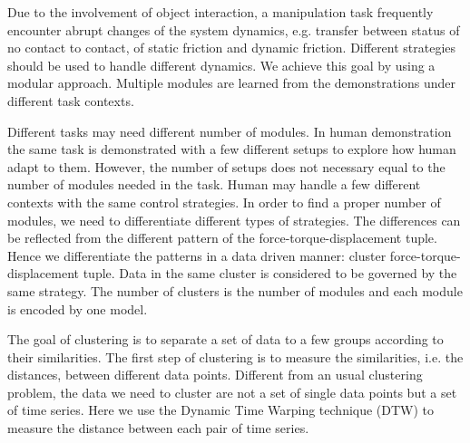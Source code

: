 Due to the involvement of object interaction, a manipulation task frequently encounter abrupt changes of the system dynamics, e.g. transfer between status of no contact to contact, of static friction and dynamic friction. Different strategies should be used to handle different dynamics. We achieve this goal by using a modular approach. Multiple modules are learned from the demonstrations under different task contexts. %


Different tasks may need different number of modules. In human demonstration the same task is demonstrated with a few different setups to explore how human adapt to them. However, the number of setups does not necessary equal to the number of modules needed in the task. Human may handle a few different contexts with the same control strategies. %
In order to find a proper number of modules, we need to differentiate different types of strategies. The differences can be reflected from the different pattern of the force-torque-displacement tuple. Hence we differentiate the patterns in a data driven manner: cluster force-torque-displacement tuple. Data in the same cluster is considered to be governed by the same strategy. The number of clusters is the number of modules and each module is encoded by one model.


The goal of clustering is to separate a set of data to a few groups according to their similarities. The first step of clustering is to measure the similarities, i.e. the distances, between different data points. Different from an usual clustering problem, the data we need to cluster are not a set of single data points but a set of time series. Here we use the Dynamic Time Warping technique (DTW) to measure the distance between each pair of time series.

